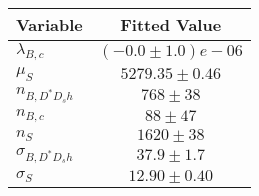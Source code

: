 \begin{tabular}[t]{lc}
\hline
Variable &Fitted Value\\
\hline\hline
$\lambda_{B,c}$&$(-0.0\pm1.0)e-06$\\
\hline
$\mu_S$&$5279.35\pm0.46$\\
\hline
$n_{B, D^* D_s h}$&$768\pm38$\\
\hline
$n_{B,c}$&$88\pm47$\\
\hline
$n_S$&$1620\pm38$\\
\hline
$\sigma_{B, D^* D_s h}$&$37.9\pm1.7$\\
\hline
$\sigma_S$&$12.90\pm0.40$\\
\hline
\end{tabular}